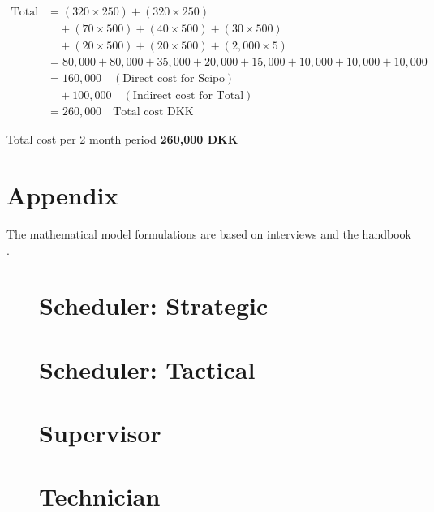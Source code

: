 \documentclass{article}
\begin{document}
\[
\begin{aligned}
    \text{Total Cost} &= (320 \times 250) + (320 \times 250) \\
    &\quad + (70 \times 500) + (40 \times 500) + (30 \times 500) \\
    &\quad + (20 \times 500) + (20 \times 500) + (2,000 \times 5) \\
    &= 80,000 + 80,000 + 35,000 + 20,000 + 15,000 + 10,000 + 10,000 + 10,000  \\
    &= 160,000 \quad (\text {Direct cost for Scipo}) \\
    &\quad + 100,000 \quad (\text {Indirect cost for Total}) \\
    &= 260,000 \quad \text{Total cost DKK}
\end{aligned}
\]

Total cost per 2 month period \textbf{260,000 DKK}


\newpage
\section{Appendix}

The mathematical model formulations are based on interviews and
the handbook \citep{palmerMaintenancePlanningScheduling2019}.


\begin{figure}[H]
    \section{Scheduler: Strategic}
    \strategicModel[clustering=true, beta=false, normal=false, multiskill=true]
\end{figure}



\begin{figure}[H]
    \section{Scheduler: Tactical}
    \tacticalModel[]
\end{figure}


\begin{figure}[H]
    \section{Supervisor}
    \supervisorModel[]
\end{figure}


\begin{figure}[H]
    \section{Technician}
    \operationalModel[]
\end{figure}



\end{document}
